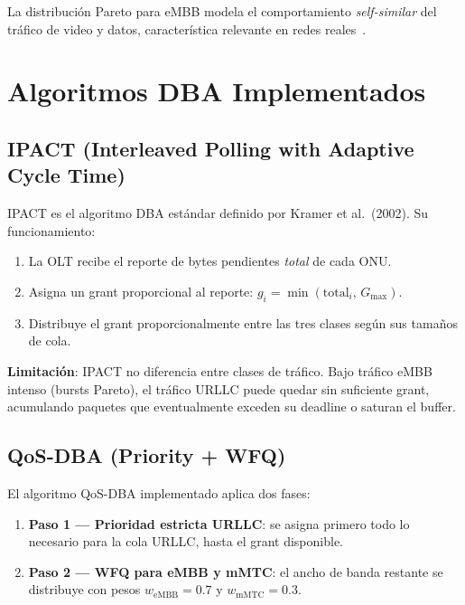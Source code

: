 \documentclass[12pt, letterpaper]{article}
\begin{document}
La distribución Pareto para eMBB modela el comportamiento \textit{self-similar} del tráfico de video y datos, característica relevante en redes reales~\cite{leland1994}.

\section{Algoritmos DBA Implementados}

\subsection{IPACT (Interleaved Polling with Adaptive Cycle Time)}

IPACT es el algoritmo DBA estándar definido por Kramer et al.\ (2002). Su funcionamiento:

\begin{enumerate}[leftmargin=1.5em]
  \item La OLT recibe el reporte de bytes pendientes \textit{total} de cada ONU.
  \item Asigna un grant proporcional al reporte: $g_i = \min\!\left(\text{total}_i,\,G_{\max}\right)$.
  \item Distribuye el grant proporcionalmente entre las tres clases según sus tamaños de cola.
\end{enumerate}

\textbf{Limitación}: IPACT no diferencia entre clases de tráfico. Bajo tráfico eMBB intenso (bursts Pareto), el tráfico URLLC puede quedar sin suficiente grant, acumulando paquetes que eventualmente exceden su deadline o saturan el buffer.

\subsection{QoS-DBA (Priority + WFQ)}

El algoritmo QoS-DBA implementado aplica dos fases:

\begin{enumerate}[leftmargin=1.5em]
  \item \textbf{Paso 1 — Prioridad estricta URLLC}: se asigna primero todo lo necesario para la cola URLLC, hasta el grant disponible.
  \item \textbf{Paso 2 — WFQ para eMBB y mMTC}: el ancho de banda restante se distribuye con pesos $w_{\text{eMBB}}=0.7$ y $w_{\text{mMTC}}=0.3$.
\end{enumerate}
\end{document}
